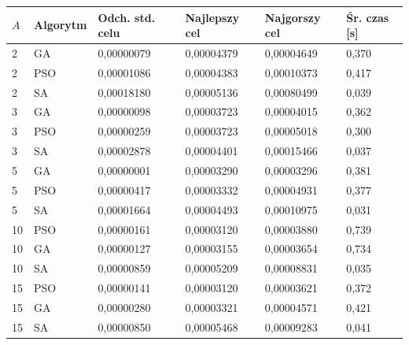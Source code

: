 \begin{tabular}{llllll}
\toprule
$A$ & Algorytm & Odch. std. celu & Najlepszy cel & Najgorszy cel & Śr. czas [s] \\
\midrule
2 & GA & 0{,}00000079 & 0{,}00004379 & 0{,}00004649 & 0{,}370 \\
2 & PSO & 0{,}00001086 & 0{,}00004383 & 0{,}00010373 & 0{,}417 \\
2 & SA & 0{,}00018180 & 0{,}00005136 & 0{,}00080499 & 0{,}039 \\
3 & GA & 0{,}00000098 & 0{,}00003723 & 0{,}00004015 & 0{,}362 \\
3 & PSO & 0{,}00000259 & 0{,}00003723 & 0{,}00005018 & 0{,}300 \\
3 & SA & 0{,}00002878 & 0{,}00004401 & 0{,}00015466 & 0{,}037 \\
5 & GA & 0{,}00000001 & 0{,}00003290 & 0{,}00003296 & 0{,}381 \\
5 & PSO & 0{,}00000417 & 0{,}00003332 & 0{,}00004931 & 0{,}377 \\
5 & SA & 0{,}00001664 & 0{,}00004493 & 0{,}00010975 & 0{,}031 \\
10 & PSO & 0{,}00000161 & 0{,}00003120 & 0{,}00003880 & 0{,}739 \\
10 & GA & 0{,}00000127 & 0{,}00003155 & 0{,}00003654 & 0{,}734 \\
10 & SA & 0{,}00000859 & 0{,}00005209 & 0{,}00008831 & 0{,}035 \\
15 & PSO & 0{,}00000141 & 0{,}00003120 & 0{,}00003621 & 0{,}372 \\
15 & GA & 0{,}00000280 & 0{,}00003321 & 0{,}00004571 & 0{,}421 \\
15 & SA & 0{,}00000850 & 0{,}00005468 & 0{,}00009283 & 0{,}041 \\
\bottomrule
\end{tabular}
